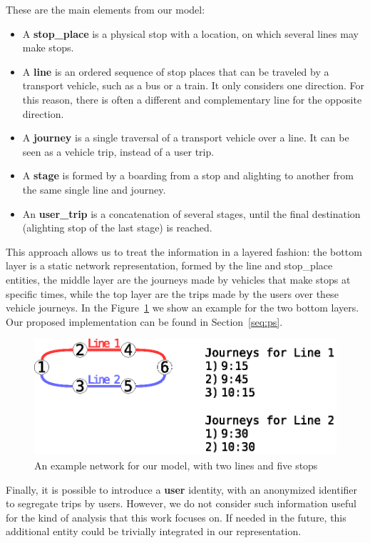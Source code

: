 \documentclass[runningheads]{llncs}
\begin{document}
These are the main elements from our model:
\begin{itemize}
    \item A \textbf{stop\_place} is a physical stop with a location, on which several lines may make stops.
    \item A \textbf{line} is an ordered sequence of stop places that can be traveled by a transport vehicle, such as a bus or a train. It only considers one direction. For this reason, there is often a different and complementary line for the opposite direction.
    \item A \textbf{journey} is a single traversal of a transport vehicle over a line. It can be seen as a vehicle trip, instead of a user trip.
    \item A \textbf{stage} is formed by a boarding from a stop and alighting to another from the same single line and journey.
    \item An \textbf{user\_trip} is a concatenation of several stages, until the final destination (alighting stop of the last stage) is reached.
\end{itemize}

This approach allows us to treat the information in a layered fashion: the bottom layer is a static network representation, formed by the line and stop\_place entities, the middle layer are the journeys made by vehicles that make stops at specific times, while the top layer are the trips made by the users over these vehicle journeys. In the Figure~\ref{fig:example_network} we show an example for the two bottom layers. Our proposed implementation can be found in Section~\ref{seq:ps}.

\begin{figure}
\includegraphics[width=\textwidth]{example_network.eps}
\caption{An example network for our model, with two lines and five stops}
\label{fig:example_network}
\end{figure}

Finally, it is possible to introduce a \textbf{user} identity, with an anonymized identifier to segregate trips by users. However, we do not consider such information useful for the kind of analysis that this work focuses on. If needed in the future, this additional entity could be trivially integrated in our representation.
\end{document}
